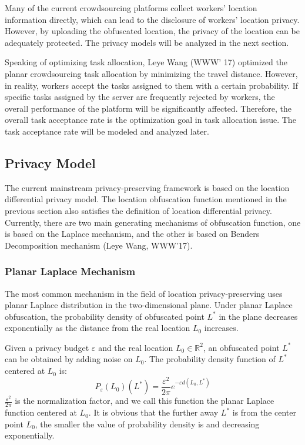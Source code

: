 Many of the current crowdsourcing platforms collect workers' location information directly, which can lead to the disclosure of workers' location privacy. However, by uploading the obfuscated location, the privacy of the location can be adequately protected. The privacy models will be analyzed in the next section.

Speaking of optimizing task allocation, Leye Wang (WWW' 17) optimized the planar crowdsourcing task allocation by minimizing the travel distance. However, in reality, workers accept the tasks assigned to them with a certain probability. If specific tasks assigned by the server are frequently rejected by workers, the overall performance of the platform will be significantly affected. Therefore, the overall task acceptance rate is the optimization goal in task allocation issue. The task acceptance rate will be modeled and analyzed later.

\subsection{Privacy Model}
The current mainstream privacy-preserving framework is based on the location differential privacy model. The location obfuscation function mentioned in the previous section also satisfies the definition of location differential privacy. Currently, there are two main generating mechanisms of obfuscation function, one is based on the Laplace mechanism, and the other is based on Benders Decomposition mechanism (Leye Wang, WWW'17).

\subsubsection{Planar Laplace Mechanism}
The most common mechanism in the field of location privacy-preserving uses planar Laplace distribution in the two-dimensional plane. Under planar Laplace obfuscation, the probability density of obfuscated point $L^*$ in the plane decreases exponentially as the distance from the real location $L_0$ increases. 

Given a privacy budget $\varepsilon$ and the real location $L_0 \in \mathbb R^2$, an obfuscated point $L^*$ can be obtained by adding noise on $L_0$. The probability density function of $L^*$ centered at $L_0$ is:
$$
	P_\varepsilon (L_0)(L^*)=\frac{\varepsilon^2}{2\pi} e^{-\varepsilon d(L_0,L^*)}
$$
$\frac{\varepsilon^2}{2\pi}$ is the normalization factor, and we call this function the planar Laplace function centered at $L_0$. It is obvious that the further away $L^*$ is from the center point $L_0$, the smaller the value of probability density is and decreasing exponentially.

